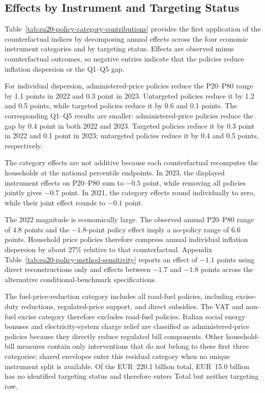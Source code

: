 \documentclass[11pt]{article}
\begin{document}
\subsection{Effects by Instrument and Targeting Status}

Table~\ref{tab:ea20-policy-category-contributions} provides the first application of the
counterfactual indices by decomposing annual effects across the four economic instrument categories
and by targeting status. Effects are observed minus counterfactual outcomes, so negative entries
indicate that the policies reduce inflation dispersion or the Q1--Q5 gap.

For individual dispersion, administered-price policies reduce the P20--P80 range by 1.1 points in
2022 and 0.3 point in 2023. Untargeted policies reduce it by 1.2 and 0.5 points, while targeted
policies reduce it by 0.6 and 0.1 points. The corresponding Q1--Q5 results are smaller:
administered-price policies reduce the gap by 0.4 point in both 2022 and 2023. Targeted policies
reduce it by 0.3 point in 2022 and 0.1 point in 2023; untargeted policies reduce it by 0.4 and 0.5
points, respectively.

The category effects are not additive because each counterfactual recomputes the households at the
national percentile endpoints. In 2023, the displayed instrument effects on P20--P80 sum to $-0.5$
point, while removing all policies jointly gives $-0.7$ point. In 2021, the category effects round
individually to zero, while their joint effect rounds to $-0.1$ point.

The 2022 magnitude is economically large. The observed annual P20--P80 range of 4.8 points and the
$-1.8$-point policy effect imply a no-policy range of 6.6 points. Household price policies therefore
compress annual individual inflation dispersion by about 27\% relative to that counterfactual.
Appendix Table~\ref{tab:ea20-policy-method-sensitivity} reports an effect of $-1.1$ points using
direct reconstructions only and effects between $-1.7$ and $-1.8$ points across the alternative
conditional-benchmark specifications.

The fuel-price-reduction category includes all road-fuel policies, including excise-duty reductions,
regulated-price support, and direct subsidies. The VAT and non-fuel excise category therefore
excludes road-fuel policies. Italian social energy bonuses and electricity-system charge relief are
classified as administered-price policies because they directly reduce regulated bill components.
Other household-bill measures contain only interventions that do not belong to these first three
categories; shared envelopes enter this residual category when no unique instrument split is
available. Of the EUR~220.1 billion total, EUR~15.0 billion has no identified targeting status and
therefore enters Total but neither targeting row.
\end{document}
